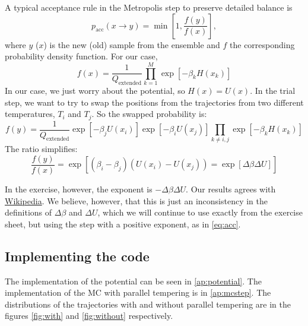 \documentclass[11pt]{article}
\newcommand{\sub}[1]{_{\text{#1}}}
\begin{document}
A typical acceptance rule in the Metropolis step to preserve detailed balance is 
\begin{equation}
	p\sub{acc}(x\rightarrow y) = \min\left[1, \frac{f(y)}{f(x)}\right],
\end{equation}
where $y$ ($x$) is the new (old) sample from the ensemble and $f$ the corresponding probability density function.
For our case, 
\begin{equation}
	f(x) = \frac{1}{Q\sub{extended}}\prod_{k=1}^{M}\exp[-\beta_k H(x_k)]
\end{equation}
In our case, we just worry about the potential, so $H(x) = U(x)$.
In the trial step, we want to try to swap the positions from the trajectories from two different temperatures, $T_i$ and $T_j$.
So the swapped probability is:
\begin{equation}
	f(y) = \frac{1}{Q\sub{extended}}\exp[-\beta_j U(x_i)]\exp[-\beta_i U(x_j)]\prod_{k\neq i,j}\exp[-\beta_k H(x_k)]
\end{equation}
The ratio simplifies:
\begin{equation}\label{eq:acc}
	\frac{f(y)}{f(x)} = \exp\left[  (\beta_i - \beta_j) (U(x_i) - U(x_j)) = \exp[\Delta\beta\Delta U]      \right]
\end{equation}

In the exercise, however, the exponent is $-\Delta\beta\Delta U$. Our results agrees with \href{https://en.wikipedia.org/wiki/Parallel_tempering}{Wikipedia}.
We believe, however, that this is just an inconsistency in the definitions of $\Delta\beta$ and $\Delta U$, which we will continue to use exactly from the exercise sheet, but using the step with a positive exponent, as in \autoref{eq:acc}.

\subsection{Implementing the code}

The implementation of the potential can be seen in \autoref{ap:potential}.
The implementation of the MC with parallel tempering is in \autoref{ap:mcstep}.
The distributions of the trajectories with and without parallel tempering are in the figures \ref{fig:with} and \ref{fig:without} respectively.
\end{document}
